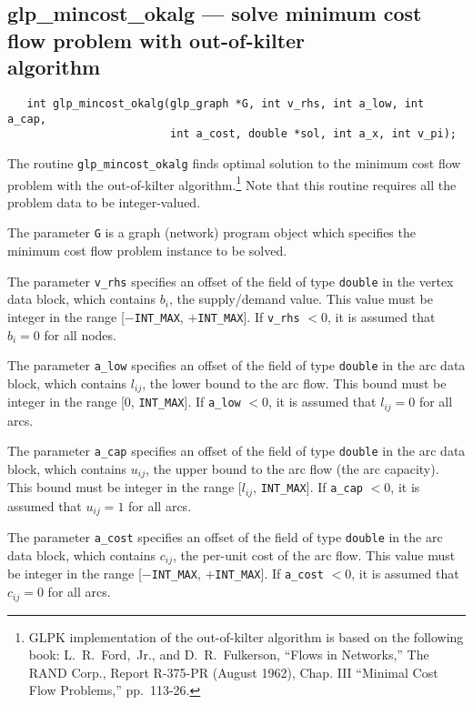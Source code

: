 \documentclass[11pt]{report}
\def\para#1{\noindent{\bf#1}}
\def\synopsis{\para{Synopsis}}
\def\description{\para{Description}}
\begin{document}

\subsection{glp\_mincost\_okalg --- solve minimum cost flow problem
with out-of-kilter\\algorithm}

\synopsis

\begin{verbatim}
   int glp_mincost_okalg(glp_graph *G, int v_rhs, int a_low, int a_cap,
                         int a_cost, double *sol, int a_x, int v_pi);
\end{verbatim}

\description

The routine \verb|glp_mincost_okalg| finds optimal solution to the
minimum cost flow problem with the out-of-kilter
algorithm.\footnote{GLPK implementation of the out-of-kilter algorithm
is based on the following book: L.~R.~Ford,~Jr., and D.~R.~Fulkerson,
``Flows in Networks,'' The RAND Corp., Report R-375-PR (August 1962),
Chap. III ``Minimal Cost Flow Problems,'' pp.~113-26.} Note that this
routine requires all the problem data to be integer-valued.

The parameter \verb|G| is a graph (network) program object which
specifies the minimum cost flow problem instance to be solved.

The parameter \verb|v_rhs| specifies an offset of the field of type
\verb|double| in the vertex data block, which contains $b_i$, the
supply/demand value. This value must be integer in the range
[$-$\verb|INT_MAX|, $+$\verb|INT_MAX|]. If \verb|v_rhs| $<0$, it is
assumed that $b_i=0$ for all nodes.

The parameter \verb|a_low| specifies an offset of the field of type
\verb|double| in the arc data block, which contains $l_{ij}$, the lower
bound to the arc flow. This bound must be integer in the range
[$0$, \verb|INT_MAX|]. If \verb|a_low| $<0$, it is assumed that
$l_{ij}=0$ for all arcs.

The parameter \verb|a_cap| specifies an offset of the field of type
\verb|double| in the arc data block, which contains $u_{ij}$, the upper
bound to the arc flow (the arc capacity). This bound must be integer in
the range [$l_{ij}$, \verb|INT_MAX|]. If \verb|a_cap| $<0$, it is
assumed that $u_{ij}=1$ for all arcs.

\newpage

The parameter \verb|a_cost| specifies an offset of the field of type
\verb|double| in the arc data block, which contains $c_{ij}$, the
per-unit cost of the arc flow. This value must be integer in the range
[$-$\verb|INT_MAX|, $+$\verb|INT_MAX|]. If \verb|a_cost| $<0$, it is
assumed that $c_{ij}=0$ for all arcs.
\end{document}
